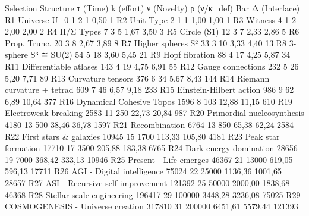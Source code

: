Selection	Structure	τ (Time)	k (effort)	ν (Novelty)	ρ (ν/κ_def)	Bar	Δ (Interface)
R1	Universe U_0	1	2	1	0,50		1
R2	Unit Type	2	1	1	1,00	1,00	1
R3	Witness	4	1	2	2,00	2,00	2
R4	Π/Σ Types	7	3	5	1,67	3,50	3
R5	Circle (S1)	12	3	7	2,33	2,86	5
R6	Prop. Trunc.	20	3	8	2,67	3,89	8
R7	Higher spheres S²	33	3	10	3,33	4,40	13
R8	3-sphere S³ ≅ SU(2)	54	5	18	3,60	5,45	21
R9	Hopf fibration	88	4	17	4,25	5,87	34
R11	Differentiable atlases	143	4	19	4,75	6,91	55
R12	Gauge connections	232	5	26	5,20	7,71	89
R13	Curvature tensors	376	6	34	5,67	8,43	144
R14	Riemann curvature + tetrad	609	7	46	6,57	9,18	233
R15	Einstein-Hilbert action	986	9	62	6,89	10,64	377
R16	Dynamical Cohesive Topos	1596	8	103	12,88	11,15	610
R19	Electroweak breaking	2583	11	250	22,73	20,84	987
R20	Primordial nucleosynthesis	4180	13	500	38,46	36,78	1597
R21	Recombination	6764	13	850	65,38	62,24	2584
R22	First stars & galaxies	10945	15	1700	113,33	105,80	4181
R23	Peak star formation	17710	17	3500	205,88	183,38	6765
R24	Dark energy domination	28656	19	7000	368,42	333,13	10946
R25	Present - Life emerges	46367	21	13000	619,05	596,13	17711
R26	AGI - Digital intelligence	75024	22	25000	1136,36	1001,65	28657
R27	ASI - Recursive self-improvement	121392	25	50000	2000,00	1838,68	46368
R28	Stellar-scale engineering	196417	29	100000	3448,28	3236,08	75025
R29	COSMOGENESIS - Universe creation	317810	31	200000	6451,61	5579,44	121393